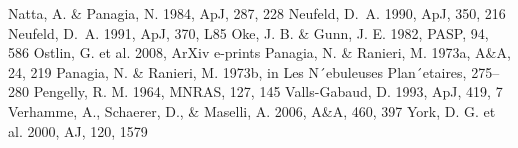 \documentclass[manuscript]{emulateapj}
\begin{document}
\begin{thebibliography}{32}
 Natta, A. \& Panagia, N. 1984, ApJ, 287, 228
 Neufeld, D.~A. 1990, ApJ, 350, 216
 Neufeld, D.~A. 1991, ApJ, 370, L85
 Oke, J. B. \& Gunn, J. E. 1982, PASP, 94, 586
 Ostlin, G. et al. 2008, ArXiv e-prints
 Panagia, N. \& Ranieri, M. 1973a, A\&A, 24, 219
 Panagia, N. \& Ranieri, M. 1973b, in Les N´ebuleuses Plan´etaires, 275–280
 Pengelly, R. M. 1964, MNRAS, 127, 145
 Valls-Gabaud, D. 1993, ApJ, 419, 7
 Verhamme, A., Schaerer, D., \& Maselli, A. 2006, A\&A, 460, 397
 York, D. G. et al. 2000, AJ, 120, 1579



\end{thebibliography}
\end{document}

